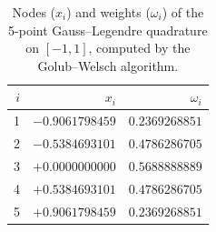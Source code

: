 \begin{table}[ht]
\centering
\normalsize
\caption{Nodes ($x_i$) and weights ($\omega_i$) of the 5-point Gauss--Legendre quadrature on $[-1, 1]$, computed by the Golub--Welsch algorithm.}
\label{tab:gl_nodes}
\begin{threeparttable}
\begin{tabular}{rrr}
\hline
$i$ & $x_i$ & $\omega_i$ \\
\hline
1 & $-0.9061798459$ & $0.2369268851$ \\
2 & $-0.5384693101$ & $0.4786286705$ \\
3 & $+0.0000000000$ & $0.5688888889$ \\
4 & $+0.5384693101$ & $0.4786286705$ \\
5 & $+0.9061798459$ & $0.2369268851$ \\
\hline
\end{tabular}
\end{threeparttable}
\end{table}
